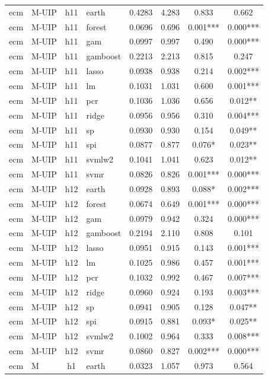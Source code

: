 \begin{ThreePartTable}
\begin{longtable}[t]{llclcccc}
ecm & M-UIP & h11 & earth & 0.4283 & 4.283 & 0.833 & 0.662\\
ecm & M-UIP & h11 & forest & 0.0696 & 0.696 & 0.001*** & 0.000***\\
ecm & M-UIP & h11 & gam & 0.0997 & 0.997 & 0.490 & 0.000***\\
ecm & M-UIP & h11 & gamboost & 0.2213 & 2.213 & 0.815 & 0.247\\
ecm & M-UIP & h11 & lasso & 0.0938 & 0.938 & 0.214 & 0.002***\\
ecm & M-UIP & h11 & lm & 0.1031 & 1.031 & 0.600 & 0.001***\\
ecm & M-UIP & h11 & pcr & 0.1036 & 1.036 & 0.656 & 0.012**\\
ecm & M-UIP & h11 & ridge & 0.0956 & 0.956 & 0.310 & 0.004***\\
ecm & M-UIP & h11 & sp & 0.0930 & 0.930 & 0.154 & 0.049**\\
ecm & M-UIP & h11 & spi & 0.0877 & 0.877 & 0.076* & 0.023**\\
ecm & M-UIP & h11 & svmlw2 & 0.1041 & 1.041 & 0.623 & 0.012**\\
ecm & M-UIP & h11 & svmr & 0.0826 & 0.826 & 0.001*** & 0.000***\\
\addlinespace
ecm & M-UIP & h12 & earth & 0.0928 & 0.893 & 0.088* & 0.002***\\
ecm & M-UIP & h12 & forest & 0.0674 & 0.649 & 0.001*** & 0.000***\\
ecm & M-UIP & h12 & gam & 0.0979 & 0.942 & 0.324 & 0.000***\\
ecm & M-UIP & h12 & gamboost & 0.2194 & 2.110 & 0.808 & 0.101\\
ecm & M-UIP & h12 & lasso & 0.0951 & 0.915 & 0.143 & 0.001***\\
ecm & M-UIP & h12 & lm & 0.1025 & 0.986 & 0.457 & 0.001***\\
ecm & M-UIP & h12 & pcr & 0.1032 & 0.992 & 0.467 & 0.007***\\
ecm & M-UIP & h12 & ridge & 0.0960 & 0.924 & 0.193 & 0.003***\\
ecm & M-UIP & h12 & sp & 0.0941 & 0.905 & 0.128 & 0.047**\\
ecm & M-UIP & h12 & spi & 0.0915 & 0.881 & 0.093* & 0.025**\\
ecm & M-UIP & h12 & svmlw2 & 0.1002 & 0.964 & 0.333 & 0.008***\\
ecm & M-UIP & h12 & svmr & 0.0860 & 0.827 & 0.002*** & 0.000***\\
\addlinespace
ecm & M & h1 & earth & 0.0323 & 1.057 & 0.973 & 0.564\\

\end{longtable}
\end{ThreePartTable}
